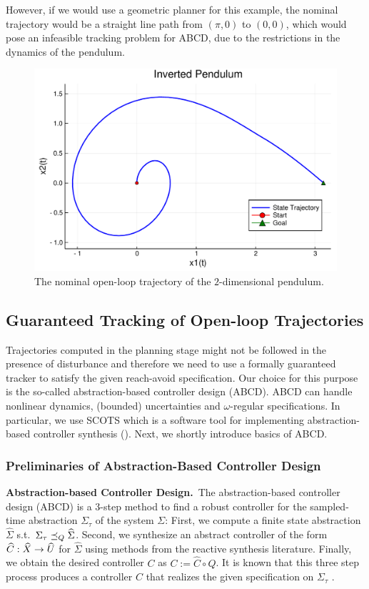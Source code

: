 \begin{remark}
	However, if we would use a geometric planner for this example, the nominal trajectory would be a straight line path from $(\pi,0)$ to $(0,0)$, which would pose an infeasible tracking problem for ABCD, due to the restrictions in the dynamics of the pendulum.
	\begin{figure}
		\includegraphics[scale=0.2]{figures/2d_pendulum_spiral}
		\caption{The nominal open-loop trajectory of the $2$-dimensional pendulum.}
		\label{fig:traj 2d pendulum}
	\end{figure}
\end{remark}


\subsection{Guaranteed Tracking of Open-loop Trajectories}
Trajectories computed in the planning stage might not be followed in the presence of disturbance and therefore we need to use a formally guaranteed tracker to satisfy the given reach-avoid specification. Our choice for this purpose is the so-called abstraction-based controller design (ABCD). ABCD can handle nonlinear dynamics, (bounded) uncertainties and $\omega$-regular specifications. In particular, we use SCOTS which is a software tool for implementing abstraction-based controller synthesis (\cite{Rungger2016scots}). Next, we shortly introduce basics of ABCD.
\subsubsection{Preliminaries of Abstraction-Based Controller Design}\hfill
\smallskip
\noindent\textbf{Abstraction-based Controller Design.}\
The abstraction-based controller design (ABCD) \cite{reissig2016feedback} is a $3$-step method to find a robust controller for the sampled-time abstraction $\Sigma_\tau$ of the system $\Sigma$:
First, we compute a finite state abstraction $\widehat{\Sigma}$ s.t.\ $\Sigma_\tau \preceq_{Q} \widehat{\Sigma}$.
Second, we synthesize an abstract controller of the form $\widehat{C}:\widehat{X}\rightarrow \widehat{U}$ for $\widehat{\Sigma}$ using methods from the reactive synthesis literature.
Finally, we obtain the desired controller $C$ as $C:=\widehat{C}\circ Q$.
It is known that this three step process produces a controller $C$ that realizes the given specification on $\Sigma_\tau$ \cite{reissig2016feedback}.


